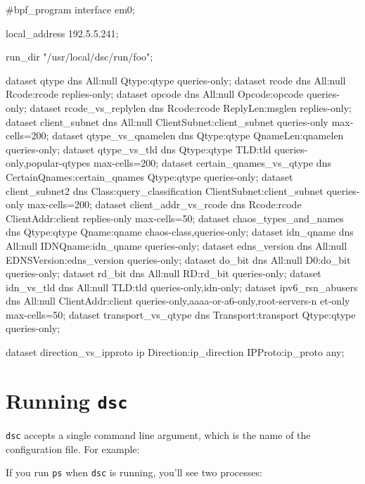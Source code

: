 \documentclass{report}
\begin{document}
\begin{MyVerbatim}
#bpf_program
interface em0;

local_address 192.5.5.241;

run_dir "/usr/local/dsc/run/foo";

dataset qtype dns All:null Qtype:qtype queries-only;
dataset rcode dns All:null Rcode:rcode replies-only;
dataset opcode dns All:null Opcode:opcode queries-only;
dataset rcode_vs_replylen dns Rcode:rcode ReplyLen:msglen replies-only;
dataset client_subnet dns All:null ClientSubnet:client_subnet queries-only
        max-cells=200;
dataset qtype_vs_qnamelen dns Qtype:qtype QnameLen:qnamelen queries-only;
dataset qtype_vs_tld dns Qtype:qtype TLD:tld queries-only,popular-qtypes
        max-cells=200;
dataset certain_qnames_vs_qtype dns CertainQnames:certain_qnames
        Qtype:qtype queries-only;
dataset client_subnet2 dns Class:query_classification
        ClientSubnet:client_subnet queries-only max-cells=200;
dataset client_addr_vs_rcode dns Rcode:rcode ClientAddr:client
        replies-only max-cells=50;
dataset chaos_types_and_names dns Qtype:qtype Qname:qname
        chaos-class,queries-only;
dataset idn_qname dns All:null IDNQname:idn_qname queries-only;
dataset edns_version dns All:null EDNSVersion:edns_version queries-only;
dataset do_bit dns All:null D0:do_bit queries-only;
dataset rd_bit dns All:null RD:rd_bit queries-only;
dataset idn_vs_tld dns All:null TLD:tld queries-only,idn-only;
dataset ipv6_rsn_abusers dns All:null ClientAddr:client
        queries-only,aaaa-or-a6-only,root-servers-n et-only max-cells=50;
dataset transport_vs_qtype dns Transport:transport Qtype:qtype queries-only;

dataset direction_vs_ipproto ip Direction:ip_direction IPProto:ip_proto
        any;
\end{MyVerbatim}

\section{Running {\tt dsc}}

{\tt dsc\/} accepts a single command line argument, which is
the name of the configuration file.  For example:

\begin{MyVerbatim}
\end{MyVerbatim}

If you run {\tt ps} when {\tt dsc} is running, you'll see two processes:
\end{document}
